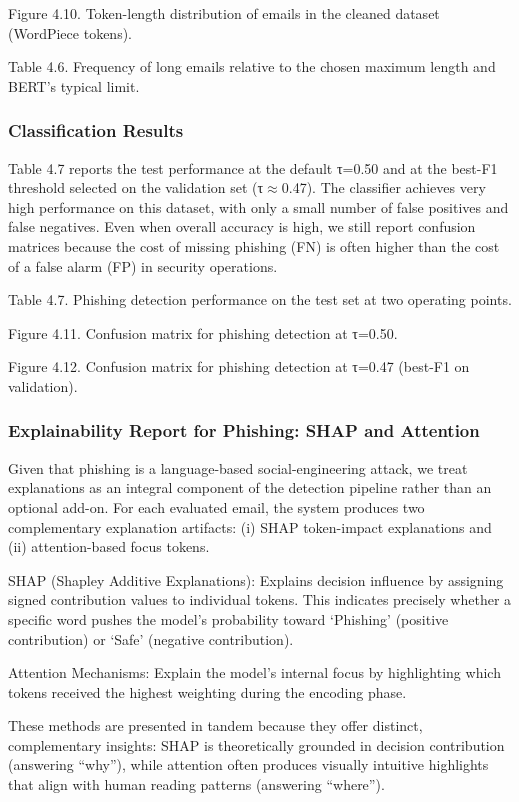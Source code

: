 \documentclass[conference]{IEEEtran}
\begin{document}
Figure 4.10. Token-length distribution of emails in the cleaned dataset (WordPiece tokens).

Table 4.6. Frequency of long emails relative to the chosen maximum length and BERT’s typical limit.

\subsubsection{Classification Results}

Table 4.7 reports the test performance at the default τ=0.50 and at the best-F1 threshold selected on the validation set (τ$\approx$0.47). The classifier achieves very high performance on this dataset, with only a small number of false positives and false negatives. Even when overall accuracy is high, we still report confusion matrices because the cost of missing phishing (FN) is often higher than the cost of a false alarm (FP) in security operations.

Table 4.7. Phishing detection performance on the test set at two operating points.

Figure 4.11. Confusion matrix for phishing detection at τ=0.50.

Figure 4.12. Confusion matrix for phishing detection at τ=0.47 (best-F1 on validation).

\subsubsection{Explainability Report for Phishing: SHAP and Attention}

Given that phishing is a language-based social-engineering attack, we treat explanations as an integral component of the detection pipeline rather than an optional add-on. For each evaluated email, the system produces two complementary explanation artifacts: (i) SHAP token-impact explanations and (ii) attention-based focus tokens.

SHAP (Shapley Additive Explanations): Explains decision influence by assigning signed contribution values to individual tokens. This indicates precisely whether a specific word pushes the model’s probability toward ‘Phishing’ (positive contribution) or ‘Safe’ (negative contribution).

Attention Mechanisms: Explain the model’s internal focus by highlighting which tokens received the highest weighting during the encoding phase.

These methods are presented in tandem because they offer distinct, complementary insights: SHAP is theoretically grounded in decision contribution (answering “why”), while attention often produces visually intuitive highlights that align with human reading patterns (answering “where”).
\end{document}
